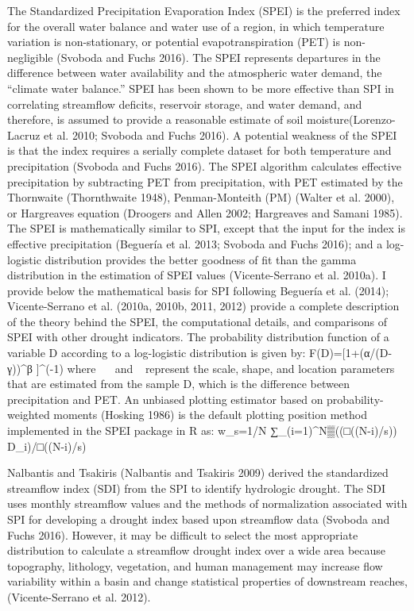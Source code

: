 \documentclass[12pt,twoside]{reedthesis}
\theoremstyle{definition}
\theoremstyle{definition}
\theoremstyle{definition}
\theoremstyle{remark}
\begin{document}
The Standardized Precipitation Evaporation Index (SPEI) is the preferred
index for the overall water balance and water use of a region, in which
temperature variation is non-stationary, or potential evapotranspiration
(PET) is non-negligible (Svoboda and Fuchs 2016). The SPEI represents
departures in the difference between water availability and the
atmospheric water demand, the ``climate water balance.'' SPEI has been
shown to be more effective than SPI in correlating streamflow deficits,
reservoir storage, and water demand, and therefore, is assumed to
provide a reasonable estimate of soil moisture(Lorenzo-Lacruz et al.
2010; Svoboda and Fuchs 2016). A potential weakness of the SPEI is that
the index requires a serially complete dataset for both temperature and
precipitation (Svoboda and Fuchs 2016). The SPEI algorithm calculates
effective precipitation by subtracting PET from precipitation, with PET
estimated by the Thornwaite (Thornthwaite 1948), Penman-Monteith (PM)
(Walter et al. 2000), or Hargreaves equation (Droogers and Allen 2002;
Hargreaves and Samani 1985). The SPEI is mathematically similar to SPI,
except that the input for the index is effective precipitation (Beguería
et al. 2013; Svoboda and Fuchs 2016); and a log-logistic distribution
provides the better goodness of fit than the gamma distribution in the
estimation of SPEI values (Vicente-Serrano et al. 2010a). I provide
below the mathematical basis for SPI following Beguería et al. (2014);
Vicente-Serrano et al. (2010a, 2010b, 2011, 2012) provide a complete
description of the theory behind the SPEI, the computational details,
and comparisons of SPEI with other drought indicators. The probability
distribution function of a variable D according to a log-logistic
distribution is given by: F(D)={[}1+(α/(D-γ))\^{}β {]}\^{}(-1) where
andrepresent the scale, shape, and location parameters that are
estimated from the sample D, which is the difference between
precipitation and PET. An unbiased plotting estimator based on
probability-weighted moments (Hosking 1986) is the default plotting
position method implemented in the SPEI package in R as: w\_s=1/N
∑\_(i=1)\^{}N▒((□((N-i)/s)) D\_i)/□((N-i)/s)

Nalbantis and Tsakiris (Nalbantis and Tsakiris 2009) derived the
standardized streamflow index (SDI) from the SPI to identify hydrologic
drought. The SDI uses monthly streamflow values and the methods of
normalization associated with SPI for developing a drought index based
upon streamflow data (Svoboda and Fuchs 2016). However, it may be
difficult to select the most appropriate distribution to calculate a
streamflow drought index over a wide area because topography, lithology,
vegetation, and human management may increase flow variability within a
basin and change statistical properties of downstream reaches,
(Vicente-Serrano et al. 2012).
\end{document}
